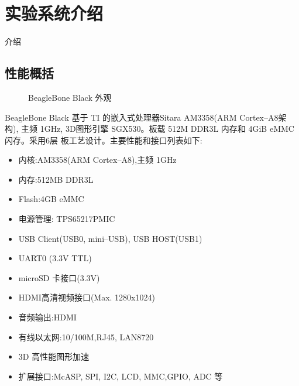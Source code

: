 \chapter{实验系统介绍}{介绍}

\section{性能概括}

\begin{figure}
\centering
{}\hspace{1cm}
\caption{BeagleBone Black 外观}
\end{figure}

BeagleBone Black 基于 TI 的嵌入式处理器Sitara AM3358(ARM Cortex--A8架构),
主频 1GHz, 3D图形引擎 SGX530。板载 512M DDR3L 内存和 4GiB eMMC闪存。采用6层
板工艺设计。主要性能和接口列表如下:
	
\begin{itemize}
    \item 内核:AM3358(ARM Cortex--A8),主频 1GHz
    \item 内存:512MB DDR3L
    \item Flash:4GB eMMC
    \item 电源管理: TPS65217PMIC
    \item USB Client(USB0, mini--USB), USB HOST(USB1)
    \item UART0 (3.3V TTL)
    \item microSD 卡接口(3.3V)
    \item HDMI高清视频接口(Max. 1280x1024)
    \item 音频输出:HDMI
    \item 有线以太网:10/100M,RJ45, LAN8720
    \item 3D 高性能图形加速
    \item 扩展接口:McASP, SPI, I2C, LCD, MMC,GPIO, ADC 等
\end{itemize}

